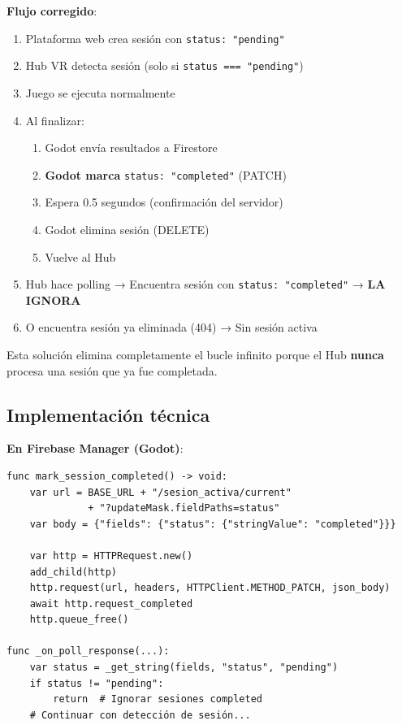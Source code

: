 \textbf{Flujo corregido}:
\begin{enumerate}
    \item Plataforma web crea sesión con \texttt{status: "pending"}
    \item Hub VR detecta sesión (solo si \texttt{status === "pending"})
    \item Juego se ejecuta normalmente
    \item Al finalizar:
    \begin{enumerate}
        \item Godot envía resultados a Firestore
        \item \textbf{Godot marca} \texttt{status: "completed"} (PATCH)
        \item Espera 0.5 segundos (confirmación del servidor)
        \item Godot elimina sesión (DELETE)
        \item Vuelve al Hub
    \end{enumerate}
    \item Hub hace polling → Encuentra sesión con \texttt{status: "completed"} → \textbf{LA IGNORA}
    \item O encuentra sesión ya eliminada (404) → Sin sesión activa
\end{enumerate}

Esta solución elimina completamente el bucle infinito porque el Hub \textbf{nunca} procesa una sesión que ya fue completada.

\subsection{Implementación técnica}

\textbf{En Firebase Manager (Godot)}:
\begin{verbatim}
func mark_session_completed() -> void:
    var url = BASE_URL + "/sesion_activa/current"
              + "?updateMask.fieldPaths=status"
    var body = {"fields": {"status": {"stringValue": "completed"}}}
    
    var http = HTTPRequest.new()
    add_child(http)
    http.request(url, headers, HTTPClient.METHOD_PATCH, json_body)
    await http.request_completed
    http.queue_free()

func _on_poll_response(...):
    var status = _get_string(fields, "status", "pending")
    if status != "pending":
        return  # Ignorar sesiones completed
    # Continuar con detección de sesión...
\end{verbatim}

